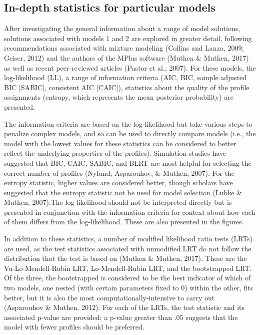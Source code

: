 \documentclass[]{book}
\theoremstyle{definition}
\theoremstyle{definition}
\theoremstyle{definition}
\theoremstyle{remark}
\begin{document}
\subsection{In-depth statistics for particular
models}\label{in-depth-statistics-for-particular-models}

After investigating the general information about a range of model
solutions, solutions associated with models 1 and 2 are explored in
greater detail, following recommendations associated with mixture
modeling (Collins and Lanza, 2009; Geiser, 2012) and the authors of the
MPlus software (Muthen \& Muthen, 2017) as well as recent peer-reviewed
articles (Pastor et al., 2007). For these models, the log-likelihood
(LL), a range of information criteria (AIC, BIC, sample adjusted BIC
{[}SABIC{]}, consistent AIC {[}CAIC{]}), statistics about the quality of
the profile assignments (entropy, which represents the mean posterior
probability) are presented.

The information criteria are based on the log-likelihood but take
various steps to penalize complex models, and so can be used to directly
compare models (i.e., the model with the lowest values for these
statistics can be considered to better reflect the underlying properties
of the profiles). Simulation studies have suggested that BIC, CAIC,
SABIC, and BLRT are most helpful for selecting the correct number of
profiles (Nylund, Asparouhov, \& Muthen, 2007). For the entropy
statistic, higher values are considered better, though scholars have
suggested that the entropy statistic not be used for model selection
(Lubke \& Muthen, 2007).The log-likelihood should not be interpreted
directly but is presented in conjunction with the information criteria
for context about how each of them differs from the log-likelihood.
These are also presented in the figures.

In addition to these statistics, a number of modified likelihood ratio
tests (LRTs) are used, as the test statistics associated with unmodified
LRT do not follow the distribution that the test is based on (Muthen \&
Muthen, 2017). These are the Vu-Lo-Mendell-Rubin LRT, Lo-Mendell-Rubin
LRT, and the bootstrapped LRT. Of the three, the bootstrapped is
considered to be the best indicator of which of two models, one nested
(with certain parameters fixed to 0) within the other, fits better, but
it is also the most computationally-intensive to carry out (Asparouhov
\& Muthen, 2012). For each of the LRTs, the test statistic and its
associated p-value are provided; a p-value greater than .05 suggests
that the model with fewer profiles should be preferred.
\end{document}
